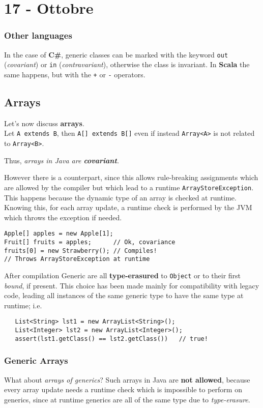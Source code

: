 \section*{17 - Ottobre}
\subsubsection*{Other languages}
In the case of \textbf{C\#}, generic classes can be marked with the keyword \lstinline|out| (\textit{covariant}) or \lstinline|in| (\textit{contravariant}),
otherwise the class is invariant.
In \textbf{Scala} the same happens,
but with the \lstinline|+| or \lstinline|-| operators.\nl

\subsection{Arrays}
Let's now discuss \textbf{arrays}.\\
Let \lstinline|A extends B|, then \lstinline|A[] extends B[]| even if instead \lstinline|Array<A>| is not related to \lstinline|Array<B>|.
\begin{center}
   Thus, \textit{arrays in Java are \textbf{covariant}.}
\end{center}

However there is a counterpart, since this allows rule-breaking assignments
which are allowed by the compiler but which lead to a runtime \lstinline|ArrayStoreException|.
This happens because the dynamic type of an array is checked at runtime.
Knowing this, for each array update, a runtime check is performed by the JVM which throws the exception if needed.
\begin{lstlisting}
Apple[] apples = new Apple[1];
Fruit[] fruits = apples;      // Ok, covariance
fruits[0] = new Strawberry(); // Compiles!
// Throws ArrayStoreException at runtime
\end{lstlisting}

After compilation Generic are all \textbf{type-erasured} to \lstinline|Object| or to their first \textit{bound}, if present.
This choice has been made mainly for compatibility with legacy code, leading all instances of the same generic type to have the same type at runtime; 
i.e.
\begin{lstlisting}
   List<String> lst1 = new ArrayList<String>();
   List<Integer> lst2 = new ArrayList<Integer>();
   assert(lst1.getClass() == lst2.getClass())   // true!
\end{lstlisting}

\subsubsection{Generic Arrays}
What about \textit{arrays of generics}?
Such arrays in Java are \textbf{not allowed},
because every array update needs a runtime check which is impossible to perform on generics,
since at runtime generics are all of the same type due to \textit{type-erasure}.


